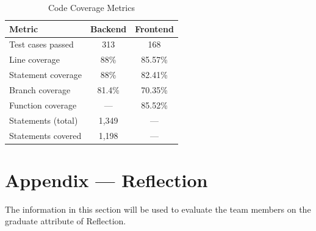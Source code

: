 \documentclass[12pt, titlepage]{article}
\begin{document}
\begin{table}[H]
  \centering
  \caption{Code Coverage Metrics}
  \label{TblCoverage}
  \begin{tabular}{lcc}
    \toprule
    \textbf{Metric}    & \textbf{Backend} & \textbf{Frontend} \\
    \midrule
    Test cases passed  & 313              & 168               \\
    Line coverage      & 88\%             & 85.57\%           \\
    Statement coverage & 88\%             & 82.41\%           \\
    Branch coverage    & 81.4\%           & 70.35\%           \\
    Function coverage  & ---              & 85.52\%           \\
    Statements (total) & 1,349            & ---               \\
    Statements covered & 1,198            & ---               \\
    \bottomrule
  \end{tabular}
\end{table}




\newpage{}
\section*{Appendix --- Reflection}

The information in this section will be used to evaluate the team members on
the graduate attribute of Reflection.
\end{document}
